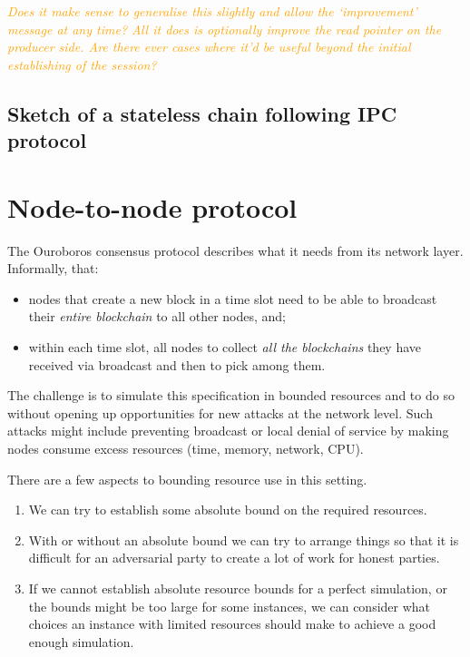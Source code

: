 \documentclass{article}
\newcommand{\dcoutts}[1]{\textcolor{orange}{\emph{#1}}}
\theoremstyle{definition}{
  \newtheorem{lemma}{Lemma}[section] %
  \newtheorem{definition}[lemma]{Definition}
}
\theoremstyle{theorem}{
  \newtheorem{invariant}[lemma]{Invariant}
  \newtheorem{proofobligation}[lemma]{Proof Obligation}
}
\numberwithin{equation}{lemma}
\begin{document}
\dcoutts{Does it make sense to generalise this slightly and allow the
`improvement' message at any time? All it does is optionally improve the read
pointer on the producer side. Are there ever cases where it'd be useful beyond
the initial establishing of the session?}

\subsection{Sketch of a stateless chain following IPC protocol}



\section{Node-to-node protocol}

The Ouroboros consensus protocol \citep{ouroboros-classic} describes what it
needs from its network layer. Informally, that:
\begin{itemize}
\item nodes that create a new block in a time slot need to be able to broadcast
      their \emph{entire blockchain} to all other nodes, and;
\item within each time slot, all nodes to collect \emph{all the blockchains}
      they have received via broadcast and then to pick among them.
\end{itemize}

The challenge is to simulate this specification in bounded resources and to do
so without opening up opportunities for new attacks at the network level. Such
attacks might include preventing broadcast or local denial of service by making
nodes consume excess resources (time, memory, network, CPU).

There are a few aspects to bounding resource use in this setting.
\begin{enumerate}
\item We can try to establish some absolute bound on the required resources.
\item With or without an absolute bound we can try to arrange things so that it
      is difficult for an adversarial party to create a lot of work for honest
      parties.
\item If we cannot establish absolute resource bounds for a perfect simulation,
      or the bounds might be too large for some instances, we can consider what
      choices an instance with limited resources should make to achieve a good
      enough simulation.
\end{enumerate}
\end{document}
